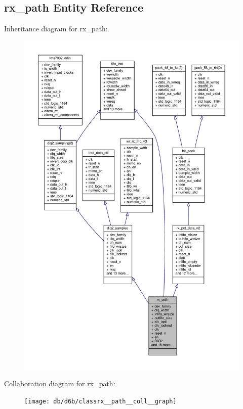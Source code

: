 \subsection{rx\+\_\+path Entity Reference}
\label{classrx__path}


Inheritance diagram for rx\+\_\+path\+:\nopagebreak
\begin{figure}[H]
\begin{center}
\leavevmode
\includegraphics[width=350pt]{d9/dbc/classrx__path__inherit__graph}
\end{center}
\end{figure}


Collaboration diagram for rx\+\_\+path\+:\nopagebreak
\begin{figure}[H]
\begin{center}
\leavevmode
\texttt{[image: db/d6b/classrx\_\_path\_\_coll\_\_graph]}
\end{center}
\end{figure}
